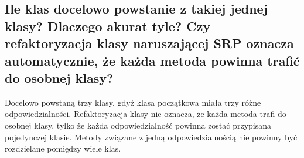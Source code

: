 \documentclass[10pt, a4paper]{article}
\begin{document}
\subsection*{Ile klas docelowo powstanie z takiej jednej klasy? Dlaczego akurat tyle? Czy refaktoryzacja klasy naruszającej SRP oznacza automatycznie, że każda metoda powinna trafić do osobnej klasy?}
Docelowo powstaną trzy klasy, gdyż klasa początkowa miała trzy różne odpowiedzialności. Refaktoryzacja klasy nie oznacza, że każda metoda trafi do osobnej klasy, tylko że każda odpowiedzialność powinna zostać przypisana pojedynczej klasie. Metody związane z jedną odpowiedzialnością nie powinny być rozdzielane pomiędzy wiele klas.
\end{document}
